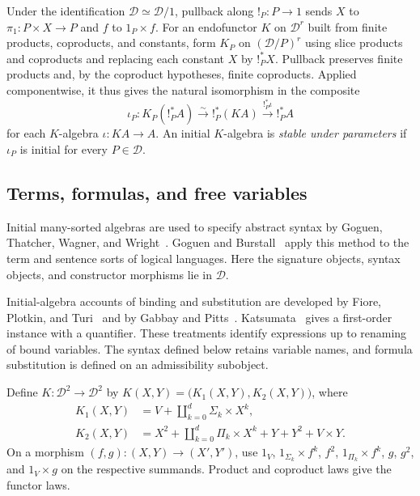 Under the identification $\mathcal D\simeq\mathcal D/1$, pullback
along $!_P:P\to1$ sends $X$ to $\pi_1:P\times X\to P$ and $f$ to
$1_P\times f$. For an endofunctor $K$ on $\mathcal D^r$ built from
finite products, coproducts, and constants, form $K_P$ on
$(\mathcal D/P)^r$ using slice products and coproducts and replacing
each constant $X$ by $!_P^*X$. Pullback preserves finite products
and, by the coproduct hypotheses, finite coproducts. Applied
componentwise, it thus gives the natural isomorphism in the composite
\[
 \iota_P:K_P(!_P^*A)\xrightarrow{\sim} !_P^*(KA)
          \xrightarrow{!_P^*\iota} !_P^*A
\]
for each $K$-algebra $\iota:KA\to A$. An initial $K$-algebra is
\emph{stable under parameters} if $\iota_P$ is initial for every
$P\in\mathcal D$.

\subsection{Terms, formulas, and free variables}
\label{app:first-order-syntax}

Initial many-sorted algebras are used to specify abstract syntax by
Goguen, Thatcher, Wagner, and Wright~\cite[Section 2]{GTWW}.
Goguen and Burstall~\cite[Section 4]{GoguenBurstall} apply this method
to the term and sentence sorts of logical languages.
Here the signature objects, syntax objects, and constructor morphisms
lie in $\mathcal D$.

Initial-algebra accounts of binding and substitution are developed by
Fiore, Plotkin, and Turi~\cite[Sections 2--4]{FPT} and by
Gabbay and Pitts~\cite[Section 6]{GabbayPitts}.
Katsumata~\cite[Section 2, Example 1(3)]{Katsumata} gives a first-order
instance with a quantifier. These treatments identify expressions up to
renaming of bound variables. The syntax defined below retains variable
names, and formula substitution is defined on an admissibility subobject.

Define $K:\mathcal D^2\to\mathcal D^2$ by
$K(X,Y)=\bigl(K_1(X,Y),K_2(X,Y)\bigr)$, where
\begin{align}
 K_1(X,Y)&=V+\coprod_{k=0}^{d}\Sigma_k\times X^k,
                                                        \label{eq:term-functor}\\
 K_2(X,Y)&=X^2+\coprod_{k=0}^{d}\Pi_k\times X^k
                  +Y+Y^2+V\times Y.                    \label{eq:formula-functor}
\end{align}
On a morphism $(f,g):(X,Y)\to(X',Y')$, use
$1_V$, $1_{\Sigma_k}\times f^k$, $f^2$,
$1_{\Pi_k}\times f^k$, $g$, $g^2$, and $1_V\times g$ on
the respective summands. Product and coproduct laws give the
functor laws.

